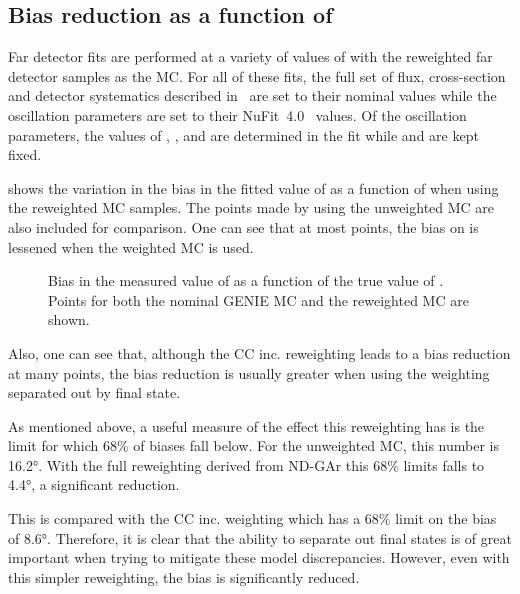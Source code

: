 \subsection{Bias reduction as a function of \dcp}
\label{sec:dune_ndrwt:rwt:biasReduction}

Far detector fits are performed at a variety of values of \dcp with the reweighted far detector samples as the MC.
For all of these fits, the full set of flux, cross-section and detector systematics described in~\cite{Abi:2020qib} are set to their nominal values while the oscillation parameters are set to their NuFit~4.0~\cite{nufit4} values.
Of the oscillation parameters, the values of , ,  and \dcp are determined in the fit while  and  are kept fixed.

 shows the variation in the bias in the fitted value of \dcp as a function of \dcpTrue when using the reweighted MC samples.
The points made by using the unweighted MC are also included for comparison.
One can see that at most points, the bias on \dcp is lessened when the weighted MC is used.

\begin{figure}[h]
	\begin{adjustbox}{max totalsize=.75\linewidth, center}
		
	\end{adjustbox}
	\caption[Bias in fit value of \dcp with ND-GAr reweighted MC]{Bias in the measured value of \dcp as a function of the true value of \dcp. Points for both the nominal GENIE MC and the reweighted MC are shown.}
	\label{fig:dcpBiasWithWgt}
\end{figure}

Also, one can see that, although the CC inc. reweighting leads to a bias reduction at many points, the bias reduction is usually greater when using the weighting separated out by final state.

As mentioned above, a useful measure of the effect this reweighting has is the limit for which 68\% of biases fall below.
For the unweighted MC, this number is \ang{16.2}. 
With the full reweighting derived from ND-GAr this 68\% limits falls to \ang{4.4}, a significant reduction.

This is compared with the CC inc. weighting which has a 68\% limit on the \dcp bias of \ang{8.6}.
Therefore, it is clear that the ability to separate out final states is of great important when trying to mitigate these model discrepancies.
However, even with this simpler reweighting, the bias is significantly reduced.

